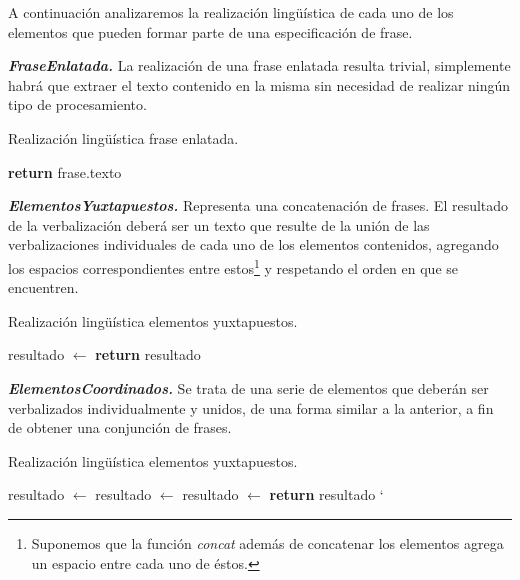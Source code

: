A continuación analizaremos la realización lingüística de cada uno de los elementos que pueden formar parte de una especificación de frase.

\medskip
\noindent
\textbf{\emph{FraseEnlatada.}} La realización de una frase enlatada resulta trivial, simplemente habrá que extraer el texto contenido en la misma sin necesidad de realizar ningún tipo de procesamiento.

\begin{algorithm}[H]
\caption{Realización lingüística frase enlatada.}
\begin{algorithmic}[1]
\State \textbf{return} frase.texto
\EndFunction
\end{algorithmic}
\end{algorithm}


\medskip
\noindent
\textbf{\emph{ElementosYuxtapuestos.}} Representa una concatenación de frases. El resultado de la verbalización deberá ser un texto que resulte de la unión de las verbalizaciones individuales de cada uno de los elementos contenidos, agregando los espacios correspondientes entre estos\footnote{Suponemos que la función \emph{concat} además de concatenar los elementos agrega un espacio entre cada uno de éstos.} y respetando el orden en que se encuentren. 

\begin{algorithm}[H]
\caption{Realización lingüística elementos yuxtapuestos.} 
\begin{algorithmic}[1]
\State resultado $\gets$ 
\EndFor
\State \textbf{return} resultado
\EndFunction
\end{algorithmic}
\end{algorithm}

\medskip
\noindent
\textbf{\emph{ElementosCoordinados.}} Se trata de una serie de elementos que deberán ser verbalizados individualmente y unidos, de una forma similar a la anterior, a fin de obtener una conjunción de frases.

\begin{algorithm}[H]
\caption{Realización lingüística elementos yuxtapuestos.}
\begin{algorithmic}[1]
\State resultado $\gets$ 
\State resultado $\gets$ 
\Else
\State resultado $\gets$ 
\EndIf
\EndFor
\State \textbf{return} resultado
\EndFunction`
\end{algorithmic}
\end{algorithm}


